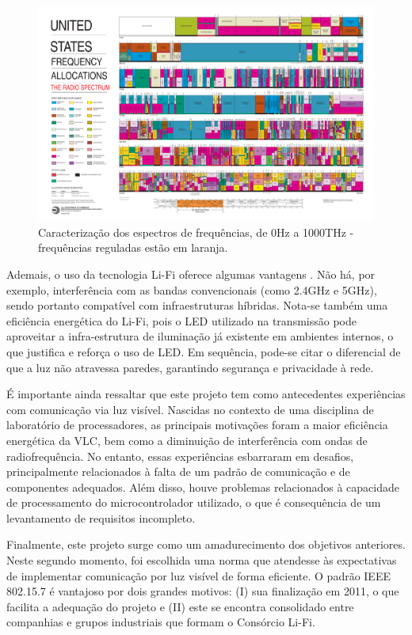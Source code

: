 	\begin{figure}[h!]
		\caption{\label{figure:intro-fcc}Caracterização dos espectros de frequências, de 0Hz a 1000THz - frequências reguladas estão em laranja.}
		\centering
		\includegraphics[width=\textwidth, trim={36.5cm 3.1cm 40cm 61cm},clip]{2003-allochrt.pdf}
	\end{figure}
	
	Ademais, o uso da tecnologia Li-Fi oferece algumas vantagens \cite{comparison-wifi}. Não há, por exemplo, interferência com as bandas convencionais (como 2.4GHz e 5GHz), sendo portanto compatível com infraestruturas híbridas. Nota-se também uma eficiência energética do Li-Fi, pois o LED utilizado na transmissão pode aproveitar a infra-estrutura de iluminação já existente em ambientes internos, o que justifica e reforça o uso de LED. Em sequência, pode-se citar o diferencial de que a luz não atravessa paredes, garantindo segurança e privacidade à rede. \par
	
	É importante ainda ressaltar que este projeto tem como antecedentes experiências com comunicação via luz visível. Nascidas no contexto de uma disciplina de laboratório de processadores, as principais motivações foram a maior eficiência energética da VLC, bem como a diminuição de interferência com ondas de radiofrequência. No entanto, essas experiências esbarraram em desafios, principalmente relacionados à falta de um padrão de comunicação e de componentes adequados. Além disso, houve problemas relacionados à capacidade de processamento do microcontrolador utilizado, o que é consequência de um levantamento de requisitos incompleto.

	Finalmente, este projeto surge como um amadurecimento dos objetivos anteriores. Neste segundo momento, foi escolhida uma norma que atendesse às expectativas de implementar comunicação por luz visível de forma eficiente. O padrão IEEE 802.15.7 é vantajoso por dois grandes motivos:
	(I) sua finalização em 2011, o que facilita a adequação do projeto e (II) este se encontra consolidado entre companhias e grupos industriais que formam o Consórcio Li-Fi.
